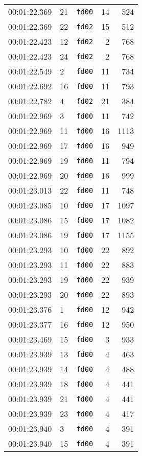\documentclass{article}
\begin{document}
\begin{longtable}{lllrr}
00:01:22.369 & 21 & \texttt{fd00} & 14 & 524 \\
00:01:22.369 & 22 & \texttt{fd02} & 15 & 512 \\
00:01:22.423 & 12 & \texttt{fd02} & 2 & 768 \\
00:01:22.423 & 24 & \texttt{fd02} & 2 & 768 \\
00:01:22.549 & 2 & \texttt{fd00} & 11 & 734 \\
00:01:22.692 & 16 & \texttt{fd00} & 11 & 793 \\
00:01:22.782 & 4 & \texttt{fd02} & 21 & 384 \\
00:01:22.969 & 3 & \texttt{fd00} & 11 & 742 \\
00:01:22.969 & 11 & \texttt{fd00} & 16 & 1113 \\
00:01:22.969 & 17 & \texttt{fd00} & 16 & 949 \\
00:01:22.969 & 19 & \texttt{fd00} & 11 & 794 \\
00:01:22.969 & 20 & \texttt{fd00} & 16 & 999 \\
00:01:23.013 & 22 & \texttt{fd00} & 11 & 748 \\
00:01:23.085 & 10 & \texttt{fd00} & 17 & 1097 \\
00:01:23.086 & 15 & \texttt{fd00} & 17 & 1082 \\
00:01:23.086 & 19 & \texttt{fd00} & 17 & 1155 \\
00:01:23.293 & 10 & \texttt{fd00} & 22 & 892 \\
00:01:23.293 & 11 & \texttt{fd00} & 22 & 883 \\
00:01:23.293 & 19 & \texttt{fd00} & 22 & 939 \\
00:01:23.293 & 20 & \texttt{fd00} & 22 & 893 \\
00:01:23.376 & 1 & \texttt{fd00} & 12 & 942 \\
00:01:23.377 & 16 & \texttt{fd00} & 12 & 950 \\
00:01:23.469 & 15 & \texttt{fd00} & 3 & 933 \\
00:01:23.939 & 13 & \texttt{fd00} & 4 & 463 \\
00:01:23.939 & 14 & \texttt{fd00} & 4 & 488 \\
00:01:23.939 & 18 & \texttt{fd00} & 4 & 441 \\
00:01:23.939 & 21 & \texttt{fd00} & 4 & 441 \\
00:01:23.939 & 23 & \texttt{fd00} & 4 & 417 \\
00:01:23.940 & 3 & \texttt{fd00} & 4 & 391 \\
00:01:23.940 & 15 & \texttt{fd00} & 4 & 391 \\

\end{longtable}
\end{document}
